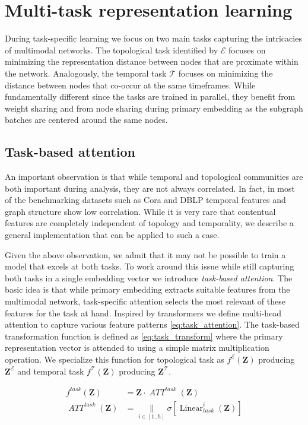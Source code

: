 \section{Multi-task representation learning}
During task-specific learning we focus on two main tasks capturing the intricacies of multimodal networks.
The topological task identified by $\mathcal{E}$ focuses on minimizing the representation distance between nodes that are proximate within the network.
Analogously, the temporal task $\mathcal{T}$ focuses on minimizing the distance between nodes that co-occur at the same timeframes.
While fundamentally different since the tasks are trained in parallel, they benefit from weight sharing and from node sharing during primary embedding as the subgraph batches are centered around the same nodes.

\subsection{Task-based attention}
An important observation is that while temporal and topological communities are both important during analysis, they are not always correlated.
In fact, in most of the benchmarking datasets such as Cora and DBLP temporal features and graph structure show low correlation.
While it is very rare that contentual features are completely independent of topology and temporality, we describe a general implementation that can be applied to such a case. 

Given the above observation, we admit that it may not be possible to train a model that excels at both tasks.
To work around this issue while still capturing both tasks in a single embedding vector we introduce \textit{task-based attention}.
The basic idea is that while primary embedding extracts suitable features from the multimodal network, task-specific attention selects the most relevant of these features for the task at hand.
%
Inspired by transformers \cite{vaswaniAttentionAllYou2017} we define multi-head attention to capture various feature patterns \cref{eq:task_attention}.
The task-based transformation function is defined as \cref{eq:task_transform} where the primary representation vector is attended to using a simple matrix multiplication operation.
We specialize this function for topological task as $f^{\mathcal{E}}(\mathbf{Z})$ producing $\mathbf{Z}^{\mathcal{E}}$ and temporal task $f^{\mathcal{T}}(\mathbf{Z})$ producing $\mathbf{Z}^{\mathcal{T}}$.

\begin{align}
    f^{task}(\mathbf{Z}) &= \mathbf{Z} \cdot \operatorname{\textit{ATT}}^{task}(\mathbf{Z}) \label{eq:task_transform}  \\
    \operatorname{\textit{ATT}}^{task}(\mathbf{Z}) &= \underset{i \in [1..h]}{\|} \sigma \left[ \operatorname{Linear}^i_{task}(\mathbf{Z}) \right] \label{eq:task_attention}
\end{align}

